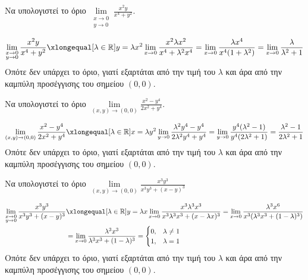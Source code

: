 \documentclass[a4paper,11pt]{report}
\begin{document}
  \begin{example}
    Να υπολογιστεί το όριο $ \lim\limits_{\substack{x\to 0 \\y \to 0}} 
    \frac{x^{2}y}{x^{4}+y^{2}} $.
    \begin{solution}
      \[
        \lim\limits_{\substack{x\to 0 \\y \to 0}} 
        \frac{x^{2}y}{x^{4}+y^{2}} 
        \xlongequal[\lambda \in \mathbb{R}]{y= \lambda x^{2}} 
        \lim_{x \to 0} \frac{x^{2} \lambda x^{2}}
        {x^{4}+\lambda^{2}x^{4}} = \lim_{x\to 0} 
        \frac{\lambda x^{4}}{x^{4}(1+\lambda ^{2})} = 
        \lim_{x \to 0} \frac{\lambda}{\lambda ^{2}+1} 
      \] 
      Οπότε δεν υπάρχει το όριο, γιατί εξαρτάται από την τιμή του $ \lambda $ 
      και άρα από την καμπύλη προσέγγισης του σημείου $ (0,0) $.
    \end{solution}
  \end{example}

  \begin{example}
    Να υπολογιστεί το όριο $ \lim\limits_{(x,y)\to (0, 0)} \frac{x^{2}-y^{4}}
    {2x^{2}+y^{4}} $. 
    \begin{solution}
      \[
        \lim\limits_{(x,y)\to (0, 0)} \frac{x^{2}-y^{4}}
        {2x^{2}+y^{4}} \xlongequal[\lambda \in \mathbb{R}]
        {x= \lambda y^{2}} \lim_{y \to 0} 
        \frac{\lambda ^{2}y^{4}-y^{4}}{2 \lambda ^{2}y^{4}+y^{4}} = 
        \lim_{y \to 0} \frac{y^{4}(\lambda ^{2}-1)}
        {y^{4}(2 \lambda ^{2}+1)} = 
        \frac{\lambda ^{2}-1}{2 \lambda ^{2}+1} 
      \] 
      Οπότε δεν υπάρχει το όριο, γιατί εξαρτάται από την τιμή του $ \lambda $ 
      και άρα από την καμπύλη προσέγγισης του σημείου $ (0,0) $.
    \end{solution}
  \end{example}

  \begin{example}
    Να υπολογιστεί το όριο 
    $ \lim\limits_{(x,y)\to (0, 0)} \frac{x^{3}y^{3}}{x^{3}y^{3}+ (x-y)^{3}} $ 
    \begin{solution}
    \item {}
      \begin{align*}
        \lim\limits_{\substack{x \to 0\\ y \to 0}} \frac{x^{3}y^{3}}{x^{3}y^{3} + 
        (x-y)^{3}} 
    &\xlongequal[\lambda \in \mathbb{R}]{y = \lambda x} \lim_{x \to 0} \frac{x^{3} 
    \lambda ^{3} x^{3}}{x^{3} \lambda ^{3} x^{3} + (x - \lambda x)^{3}} 
    = \lim_{x \to 0} \frac{\lambda ^{3}x^{6}}{x^{3} 
    (\lambda ^{3} x^{3} + (1- \lambda)^{3})} \\
    &= \lim_{x \to 0} \frac{\lambda ^{3} x^{3}}{\lambda ^{3}x^{3} + (1- \lambda)^{3}} 
    = 
    \begin{cases} 
      0, & \lambda \neq 1 \\ 
      1, & \lambda = 1 
    \end{cases} 
      \end{align*} 
      Οπότε δεν υπάρχει το όριο, γιατί εξαρτάται από την τιμή του 
      $ \lambda $ και άρα από την καμπύλη προσέγγισης του σημείου 
      $ (0,0) $.
    \end{solution}
  \end{example}
\end{document}
